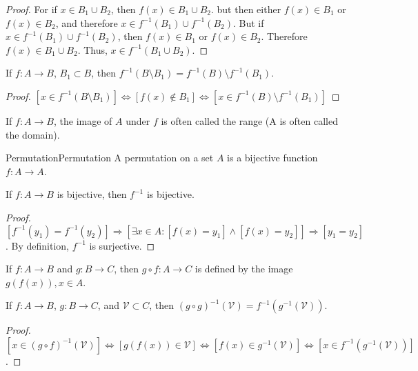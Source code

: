     \begin{proof}
        For if $x\in{B}_{1}\cup{B}_{2}$, then
        $f(x)\in{B}_{1}\cup{B}_{2}$. but then either
        $f(x)\in{B}_{1}$ or $f(x)\in{B}_{2}$, and therefore
        $x\in{f}^{\minus{1}}(B_1)\cup{f}^{\minus{1}}(B_2)$. But if
        $x\in{f}^{\minus{1}}(B_{1})\cup{f}^{\minus{1}}(B_2)$, then
        $f(x)\in{B}_{1}$ or $f(x)\in{B}_{2}$. Therefore
        $f(x)\in{B}_{1}\cup{B}_{2}$. Thus, $x\in{f}^{-1}(B_1\cup{B}_2)$.
    \end{proof}
    \begin{theorem}
    If $f:A\rightarrow B$, $B_1 \subset B$, then $f^{-1}(B\setminus B_1) = f^{-1}(B)\setminus f^{-1}(B_1)$.
    \end{theorem}
    \begin{proof}
    $[x\in f^{-1}(B\setminus B_1)]\Leftrightarrow [f(x)\notin B_1]\Leftrightarrow [x\in f^{-1}(B)\setminus f^{-1}(B_1)]$
    \end{proof}
    If $f:A\rightarrow B$, the image of $A$ under $f$
    is often called the range (A is often called the domain).
    \begin{fdefinition}{Permutation}{Permutation}
        A \gls{permutation} on a \gls{set} $A$ is a \gls{bijective function}
        $f:A\rightarrow{A}$.
    \end{fdefinition}
    \begin{theorem}
    If $f:A\rightarrow B$ is bijective, then $f^{-1}$ is bijective.
    \end{theorem}
    \begin{proof}
    $[f^{-1}(y_1) = f^{-1}(y_2)]\Rightarrow [\exists x\in A:[f(x) = y_1]\land [f(x)=y_2]]\Rightarrow [y_1=y_2]$. By definition, $f^{-1}$ is surjective.
    \end{proof}
    \begin{definition}
    If $f:A\rightarrow B$ and $g:B\rightarrow C$, then $g\circ f:A\rightarrow C$ is defined by the image $g(f(x)), x\in A$. 
    \end{definition}
    \begin{theorem}
    If $f:A\rightarrow B$, $g:B\rightarrow C$, and $\mathcal{V}\subset C$, then $(g\circ g)^{-1}(\mathcal{V}) = f^{-1}(g^{-1}(\mathcal{V}))$.
    \end{theorem}
    \begin{proof}
    $[x\in (g\circ f)^{-1}(\mathcal{V})]\Leftrightarrow [g(f(x))\in \mathcal{V}] \Leftrightarrow [f(x)\in g^{-1}(\mathcal{V})]\Leftrightarrow [x\in f^{-1}(g^{-1}(\mathcal{V}))]$.
    \end{proof}
